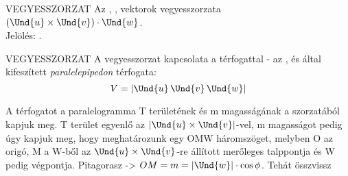 \begin{definicio}{VEGYESSZORZAT}
Az , ,   vektorok vegyesszorzata $(\Und{u}\times\Und{v})\cdot\Und{w}$.\\Jelölés:   .
\end{definicio}

\begin{tetel}{VEGYESSZORZAT}
A vegyesszorzat kapcsolata a térfogattal - az ,  és  által kifeszített \textit{paralelepipedon} térfogata:
$$V = |\Und{u}\, \Und{v}\, \Und{w}|$$
\end{tetel}

\begin{bizonyitas}{}
A térfogatot a paralelogramma T területének és m magasságának a szorzatából kapjuk meg. T terület egyenlő az $|\Und{u}\times\Und{v}|$-vel, m magasságot pedig úgy kapjuk meg, hogy meghatározunk egy OMW háromszöget, melyben O az origó, M a W-ből az $\Und{u}\times\Und{v}$-re állított merőleges talppontja és W pedig  végpontja. Pitagorasz -> $OM = m = |\Und{w}| \cdot \cos\phi$. Tehát összvissz
\end{bizonyitas}



